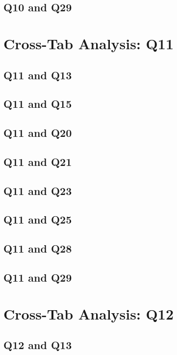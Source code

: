 \documentclass{report}
\begin{document}
\section{Q10 and Q29}\clearpage

\chapter{Cross-Tab Analysis: Q11}

\section{Q11 and Q13}\clearpage
\section{Q11 and Q15}\clearpage
\section{Q11 and Q20}\clearpage
\section{Q11 and Q21}\clearpage
\section{Q11 and Q23}\clearpage
\section{Q11 and Q25}\clearpage
\section{Q11 and Q28}\clearpage
\section{Q11 and Q29}\clearpage

\chapter{Cross-Tab Analysis: Q12}

\section{Q12 and Q13}\clearpage
\end{document}
